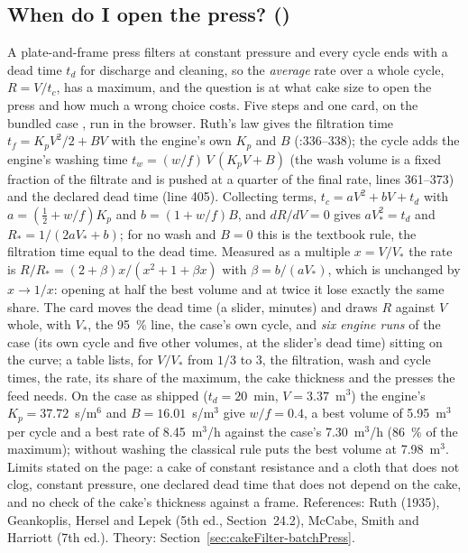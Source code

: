 \documentclass[11pt,a4paper]{article}
\begin{document}
\subsection*{When do I open the press? \quad()}\label{sec:edu-filter-press-cycle}
A plate-and-frame press filters at constant pressure and every cycle ends with a dead time $t_d$ for discharge and
cleaning, so the \emph{average} rate over a whole cycle, $R = V/t_c$, has a maximum, and the question is at what cake
size to open the press and how much a wrong choice costs.  Five steps and one card, on the bundled case
, run in the browser.  Ruth's law gives the filtration time
$t_f = K_pV^2/2 + BV$ with the engine's own $K_p$ and $B$ (:336--338); the cycle adds the
engine's washing time $t_w = (w/f)\,V\,(K_pV + B)$ (the wash volume is a fixed fraction of the filtrate and is
pushed at a quarter of the final rate, lines 361--373) and the declared dead time (line 405).  Collecting terms,
$t_c = aV^2 + bV + t_d$ with $a = (\tfrac12 + w/f)K_p$ and $b = (1 + w/f)B$, and $dR/dV = 0$ gives
$aV_*^2 = t_d$ and $R_* = 1/(2aV_* + b)$; for no wash and $B = 0$ this is the textbook rule, the filtration time
equal to the dead time.  Measured as a multiple $x = V/V_*$ the rate is
$R/R_* = (2+\beta)x/(x^2 + 1 + \beta x)$ with $\beta = b/(aV_*)$, which is unchanged by $x \to 1/x$: opening at half
the best volume and at twice it lose exactly the same share.  The card moves the dead time (a slider, minutes) and
draws $R$ against $V$ whole, with $V_*$, the 95~\% line, the case's own cycle, and \emph{six engine runs} of the case
(its own cycle and five other volumes, at the slider's dead time) sitting on the curve; a table lists, for
$V/V_*$ from $1/3$ to $3$, the filtration, wash and cycle times, the rate, its share of the maximum, the cake
thickness and the presses the feed needs.  On the case as shipped ($t_d = 20$~min, $V = 3.37$~m$^3$) the engine's
$K_p = 37.72$~s/m$^6$ and $B = 16.01$~s/m$^3$ give $w/f = 0.4$, a best volume of 5.95~m$^3$ per cycle and a best
rate of 8.45~m$^3$/h against the case's 7.30~m$^3$/h (86~\% of the maximum); without washing the classical rule
puts the best volume at 7.98~m$^3$.  Limits stated on the page: a cake of constant resistance and a cloth that does
not clog, constant pressure, one declared dead time that does not depend on the cake, and no check of the cake's
thickness against a frame.  References: Ruth (1935), Geankoplis, Hersel and Lepek (5th ed., Section~24.2),
McCabe, Smith and Harriott (7th ed.).  Theory: Section~\ref{sec:cakeFilter-batchPress}.
\end{document}
